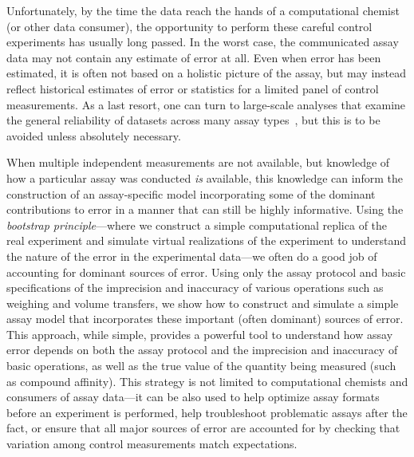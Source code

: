 \documentclass[aps,pre,twocolumn,nofootinbib,superscriptaddress,linenumbers]{revtex4-1}
\begin{document}
Unfortunately, by the time the data reach the hands of a computational chemist (or other data consumer), the opportunity to perform these careful control experiments has usually long passed.
In the worst case, the communicated assay data may not contain any estimate of error at all.
Even when error has been estimated, it is often not based on a holistic picture of the assay, but may instead reflect historical estimates of error or statistics for a limited panel of control measurements.
As a last resort, one can turn to large-scale analyses that examine the general reliability of datasets across many assay types~\cite{kramer_experimental_2012,kalliokoski_comparability_2013}, but this is to be avoided unless absolutely necessary.

When multiple independent measurements are not available, but knowledge of how a particular assay was conducted \emph{is} available, this knowledge can inform the construction of an assay-specific model incorporating some of the dominant contributions to error in a manner that can still be highly informative.
Using the \emph{bootstrap principle}---where we construct a simple computational replica of the real experiment and simulate virtual realizations of the experiment to understand the nature of the error in the experimental data---we often do a good job of accounting for dominant sources of error.
Using only the assay protocol and basic specifications of the imprecision and inaccuracy of various operations such as weighing and volume transfers, we show how to construct and simulate a simple assay model that incorporates these important (often dominant) sources of error. 
This approach, while simple, provides a powerful tool to understand how assay error depends on both the assay protocol and the imprecision and inaccuracy of basic operations, as well as the true value of the quantity being measured (such as compound affinity). 
This strategy is not limited to computational chemists and consumers of assay data---it can be also used to help optimize assay formats before an experiment is performed, help troubleshoot problematic assays after the fact, or ensure that all major sources of error are accounted for by checking that variation among control measurements match expectations.
\end{document}

